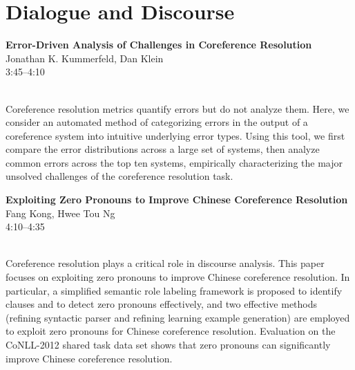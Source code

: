 \documentclass[twoside,makeidx]{book}
\begin{document}
\section{Dialogue and Discourse}
\vspace{-1em}
\par\vspace{2em}\noindent%
\begin{minipage}{\linewidth}%
\begin{center}
\textbf{\normalsize Error-Driven Analysis of Challenges in Coreference Resolution}\\
\normalsize  Jonathan K. Kummerfeld,  Dan Klein\\
{\small 3:45--4:10}\\
\end{center}
\end{minipage}\\[0.5em]
\nopagebreak%
\noindent%
{\small Coreference resolution metrics quantify errors but do not analyze them.  Here, we consider an automated method of categorizing errors in the output of a coreference system into intuitive underlying error types.  Using this tool, we first compare the error distributions across a large set of systems, then analyze common errors across the top ten systems, empirically characterizing the major unsolved challenges of the coreference resolution task.}
\par\vspace{2em}\noindent%
\begin{minipage}{\linewidth}%
\begin{center}
\textbf{\normalsize Exploiting Zero Pronouns to Improve Chinese Coreference Resolution}\\
\normalsize  Fang Kong,  Hwee Tou Ng\\
{\small 4:10--4:35}\\
\end{center}
\end{minipage}\\[0.5em]
\nopagebreak%
\noindent%
{\small Coreference resolution plays a critical role in discourse analysis. This paper focuses on exploiting zero pronouns to improve Chinese coreference resolution. In particular, a simplified semantic role labeling framework is proposed to identify clauses and to detect zero pronouns effectively, and two effective methods (refining syntactic parser and refining learning example generation) are employed to exploit zero pronouns for Chinese coreference resolution. Evaluation on the CoNLL-2012 shared task data set shows that zero pronouns can significantly improve Chinese coreference resolution.}
\end{document}
